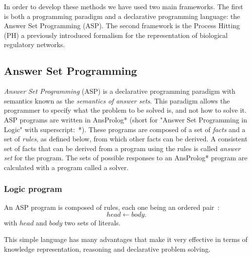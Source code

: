 In order to develop these methods we have used two main frameworks. The first is both a programming paradigm and a declarative programming language: the Answer Set Programming (ASP).
The second framework is the Process Hitting (PH) a previously introduced formalism for the representation of biological regulatory networks.

\subsection{Answer Set Programming }

\emph{Answer Set Programming} (ASP) is a declarative programming paradigm with semantics known as the \emph{semantics of answer sets}.
This paradigm allows the programmer to specify what the problem to be solved is, and not how to solve it.
ASP programs are written in AnsProlog* (short for "Answer Set Programming in Logic" with superscript:~*).
These programs are composed of a set of \emph{facts} and a set of \emph{rules}, as defined below, from which other facts can be derived.
A consistent set of facts that can be derived from a program using the rules is called \emph{answer set} for the program.
The sets of possible responses to an AnsProlog* program are calculated with a program called a solver.

\subsubsection{Logic program}
An ASP program is composed of rules, each one being an ordered pair~\cite{baral2003knowledge}:
\begin{equation} \label{eq1ASP}
head \leftarrow body.
\end{equation}
with $head$ and $body$ two sets of literals. 

This simple language has many advantages that make it very effective in terms of knowledge representation, reasoning and declarative problem solving. 
 

